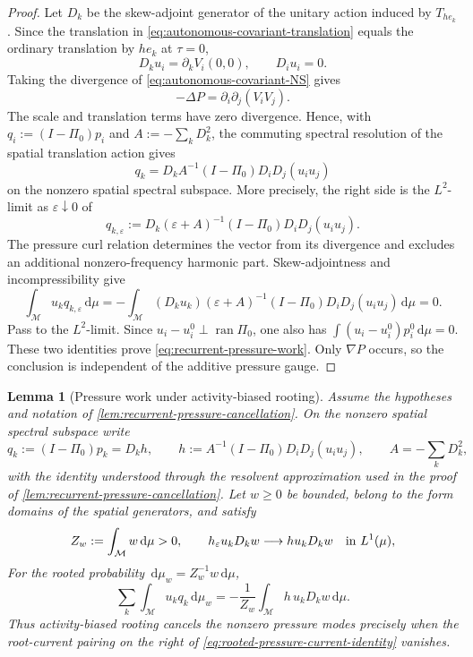 \documentclass[11pt]{amsart}
\numberwithin{equation}{section}
\theoremstyle{plain}
\newtheorem{lemma}[lemma]{Lemma}
\theoremstyle{definition}
\theoremstyle{remark}
\newcommand{\dd}{\,\mathrm d}
\begin{document}
\begin{proof}
Let \(D_k\) be the skew-adjoint generator of the unitary action induced by
\(T_{he_k}\).  Since the translation in
\eqref{eq:autonomous-covariant-translation} equals the ordinary translation
by \(he_k\) at \(\tau=0\),
\[
 D_ku_i=\partial_kV_i(0,0),
 \qquad D_iu_i=0.
\]
Taking the divergence of \eqref{eq:autonomous-covariant-NS} gives
\begin{equation}\label{eq:recurrent-pressure-poisson}
 -\Delta P=\partial_i\partial_j(V_iV_j).
\end{equation}
The scale and translation terms have zero divergence.  Hence, with
\(q_i:=(I-\Pi_0)p_i\) and
\(A:=-\sum_kD_k^2\), the commuting spectral resolution of the spatial
translation action gives
\[
 q_k
 =D_kA^{-1}(I-\Pi_0)D_iD_j(u_iu_j)
\]
on the nonzero spatial spectral subspace.  More precisely, the right side is
the \(L^2\)-limit as \(\varepsilon\downarrow0\) of
\[
 q_{k,\varepsilon}
 :=D_k(\varepsilon+A)^{-1}(I-\Pi_0)D_iD_j(u_iu_j).
\]
The pressure curl relation determines the vector from its divergence and
excludes an additional nonzero-frequency harmonic part.  Skew-adjointness
and incompressibility give
\[
 \int_{\mathcal M}u_kq_{k,\varepsilon}\dd\mu
 =-\int_{\mathcal M}(D_ku_k)
    (\varepsilon+A)^{-1}(I-\Pi_0)D_iD_j(u_iu_j)\dd\mu
 =0.
\]
Pass to the \(L^2\)-limit.  Since
\(u_i-u_i^0\perp\operatorname{ran}\Pi_0\), one also has
\(\int(u_i-u_i^0)p_i^0\dd\mu=0\).  These two identities prove
\eqref{eq:recurrent-pressure-work}.  Only \(\nabla P\) occurs, so the
conclusion is independent of the additive pressure gauge.
\end{proof}

\begin{lemma}[Pressure work under activity-biased rooting]
\label{lem:rooted-pressure-current-identity}
Assume the hypotheses and notation of
\cref{lem:recurrent-pressure-cancellation}.  On the nonzero spatial spectral
subspace write
\begin{equation}\label{eq:pressure-potential-on-hull}
 q_k:=(I-\Pi_0)p_k=D_kh,
 \qquad
 h:=A^{-1}(I-\Pi_0)D_iD_j(u_iu_j),
 \qquad A=-\sum_kD_k^2,
\end{equation}
with the identity understood through the resolvent approximation used in the
proof of \cref{lem:recurrent-pressure-cancellation}.  Let
\(w\ge0\) be bounded, belong to the form domains of the spatial generators,
and satisfy
\begin{equation}\label{eq:root-weight-normalization}
 Z_w:=\int_{\mathcal M}w\dd\mu>0,
 \qquad
 h_\varepsilon u_kD_kw\longrightarrow h u_kD_kw
 \quad\hbox{in }L^1(\mu),
\end{equation}
For the rooted probability \(\dd\mu_w=Z_w^{-1}w\dd\mu\),
\begin{equation}\label{eq:rooted-pressure-current-identity}
 \sum_k\int_{\mathcal M}u_kq_k\dd\mu_w
 =-\frac1{Z_w}\int_{\mathcal M}h\,u_kD_kw\dd\mu.
\end{equation}
Thus activity-biased rooting cancels the nonzero pressure modes precisely when
the root-current pairing on the right of
\eqref{eq:rooted-pressure-current-identity} vanishes.
\end{lemma}
\end{document}
